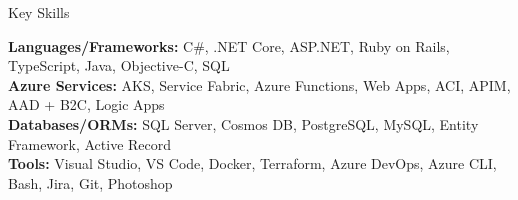 \documentclass{resume} %
\begin{document}

\begin{rSection}{Key Skills}


\textbf{Languages/Frameworks:} C\#, .NET Core, ASP.NET, Ruby on Rails, TypeScript, Java, Objective-C, SQL  \\
\textbf{Azure Services:} AKS, Service Fabric, Azure Functions, Web Apps, ACI, APIM, AAD + B2C, Logic Apps  \\
\textbf{Databases/ORMs:} SQL Server, Cosmos DB, PostgreSQL, MySQL, Entity Framework, Active Record  \\
\textbf{Tools:} Visual Studio, VS Code, Docker, Terraform, Azure DevOps, Azure CLI, Bash, Jira, Git, Photoshop

\end{rSection}

\end{document}
